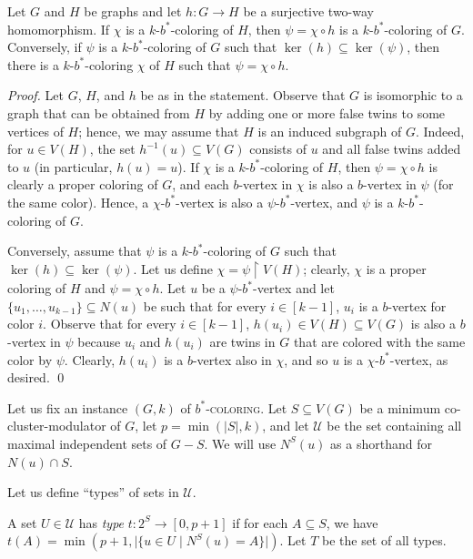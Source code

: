 \documentclass[runningheads, envcountsame]{llncs}
\newcommand{\sep}{\;|\;}
\newcommand{\seq}{\subseteq}
\newcommand{\ca}{\mathcal}
\newcommand{\bscoloring}{$b^*$-\textsc{coloring}\xspace}
\begin{document}
\begin{lemma}\label{lem:two-way-hom}
Let $G$ and $H$ be graphs and let $h\colon G\rightarrow H$ be a surjective two-way homomorphism.
If $\chi$ is a $k$-$b^*$-coloring of $H$, then $\psi = \chi \circ h$ is a $k$-$b^*$-coloring of $G$.
Conversely, if $\psi$ is a $k$-$b^*$-coloring of $G$ such that $\ker(h) \seq \ker(\psi)$, then there is a $k$-$b^*$-coloring $\chi$ of $H$ such that $\psi = \chi \circ h$.
\end{lemma}
\begin{proof}
Let $G$, $H$, and $h$ be as in the statement.
Observe that $G$ is isomorphic to a graph that can be obtained from $H$ by adding one or more false twins to some vertices of $H$; hence, we may assume that $H$ is an induced subgraph of $G$. Indeed, for $u \in V(H)$, the set $h^{-1}(u) \seq V(G)$ consists of $u$ and all false twins added to $u$ (in particular, $h(u) = u$).
If $\chi$ is a $k$-$b^*$-coloring of $H$, then $\psi = \chi \circ h$ is clearly a proper coloring of $G$, and each $b$-vertex in $\chi$ is also a $b$-vertex in $\psi$ (for the same color).
Hence, a $\chi$-$b^*$-vertex is also a $\psi$-$b^*$-vertex, and $\psi$ is a $k$-$b^*$-coloring of $G$.

Conversely, assume that $\psi$ is a $k$-$b^*$-coloring of $G$ such that $\ker(h) \seq \ker(\psi)$.
Let us define $\chi = \psi \upharpoonright V(H)$; clearly, $\chi$ is a proper coloring of $H$ and $\psi = \chi \circ h$.
Let $u$ be a $\psi$-$b^*$-vertex and let $\{u_1, \ldots, u_{k-1}\} \seq N(u)$ be such that for every $i \in [k-1]$, $u_i$ is a $b$-vertex for color $i$.
Observe that for every $i \in [k-1]$, $h(u_i)\in V(H)\seq V(G)$ is also a $b$-vertex in $\psi$ because $u_i$ and $h(u_i)$ are twins in $G$ that are colored with the same color by $\psi$.
Clearly, $h(u_i)$ is a $b$-vertex also in $\chi$, and so $u$ is a $\chi$-$b^*$-vertex, as desired.
\qed\end{proof}

Let us fix an instance $(G, k)$ of \bscoloring.
Let $S \seq V(G)$ be a minimum co-cluster-modulator of $G$, let $p = \min(|S|, k)$, and let $\ca U$ be the set containing all maximal independent sets of $G - S$.
We will use $N^S(u)$ as a shorthand for $N(u) \cap S$.

Let us define ``types'' of sets in $\ca U$.

\begin{definition}\label{def:type}
A set $U \in \ca U$ has \emph{type} $t\colon 2^S \rightarrow [0, p+1]$ if for each $A \seq S$, we have $t(A) = \min(p+1, |\{u \in U \sep N^S(u) = A\}|)$. Let $T$ be the set of all types.
\end{definition}
\end{document}

